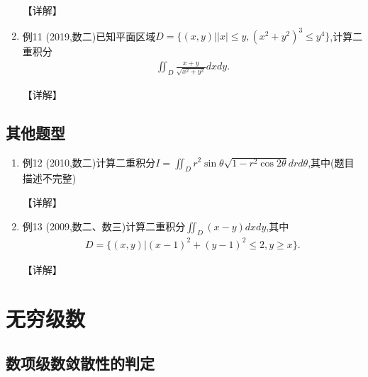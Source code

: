 \documentclass[12pt, a4paper, oneside, UTF8]{ctexbook}
\begin{document}
\begin{enumerate}[label=\arabic*.,start=6]
    \begin{solution}
    【详解】
    \end{solution}
    
    \item 例11 (2019,数二)已知平面区域$D=\{(x,y)||x|\leq y,(x^2+y^2)^3\leq y^4\}$,计算二重积分
    \begin{align*}
        \iint_D\frac{x+y}{\sqrt{x^2+y^2}}dxdy.
    \end{align*}
    
    \begin{solution}
    【详解】
    \end{solution}
\end{enumerate}

\subsection{其他题型}

\begin{enumerate}[label=\arabic*.,start=13]
    \item 例12 (2010,数二)计算二重积分$I=\iint_D r^2\sin\theta\sqrt{1-r^2\cos 2\theta} drd\theta$,其中(题目描述不完整)
    
    \begin{solution}
    【详解】
    \end{solution}
    
    \item 例13 (2009,数二、数三)计算二重积分$\iint_D(x-y)dxdy$,其中
    \begin{align*}
        D=\{(x,y)|(x-1)^2+(y-1)^2\leq 2,y\geq x\}.
    \end{align*}
    
    \begin{solution}
    【详解】
    \end{solution}
\end{enumerate}

\section{无穷级数}
\subsection{数项级数敛散性的判定}
\end{document}
